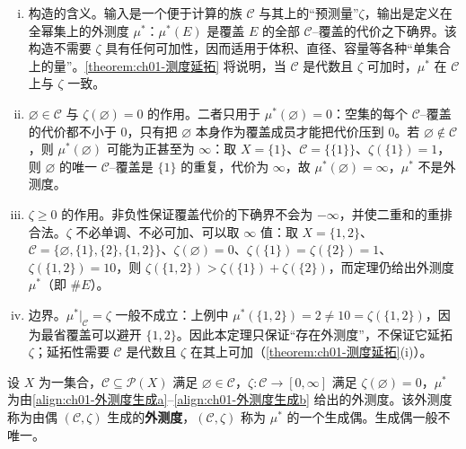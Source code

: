 \documentclass[../../main.tex]{subfiles}%
\begin{document}
\begin{remark}\label{remark:ch01-外测度生成}
\begin{enumerate}[(i)]
\item 构造的含义。输入是一个便于计算的族 $\mathcal{C}$ 与其上的“预测量”$\zeta$，输出是定义在全幂集上的外测度 $\mu^*$：$\mu^*(E)$ 是覆盖 $E$ 的全部 $\mathcal{C}$--覆盖的代价之下确界。该构造不需要 $\zeta$ 具有任何可加性，因而适用于体积、直径、容量等各种“单集合上的量”。\cref{theorem:ch01-测度延拓} 将说明，当 $\mathcal{C}$ 是代数且 $\zeta$ 可加时，$\mu^*$ 在 $\mathcal{C}$ 上与 $\zeta$ 一致。
\item $\varnothing\in\mathcal{C}$ 与 $\zeta(\varnothing )=0$ 的作用。二者只用于 $\mu^*(\varnothing )=0$：空集的每个 $\mathcal{C}$--覆盖的代价都不小于 $0$，只有把 $\varnothing$ 本身作为覆盖成员才能把代价压到 $0$。若 $\varnothing\notin\mathcal{C}$，则 $\mu^*(\varnothing )$ 可能为正甚至为 $\infty$：取 $X=\{1\}$、$\mathcal{C}=\{\{1\}\}$、$\zeta(\{1\})=1$，则 $\varnothing$ 的唯一 $\mathcal{C}$--覆盖是 $\{1\}$ 的重复，代价为 $\infty$，故 $\mu^*(\varnothing )=\infty$，$\mu^*$ 不是外测度。
\item $\zeta\geqslant 0$ 的作用。非负性保证覆盖代价的下确界不会为 $-\infty$，并使二重和的重排合法。$\zeta$ 不必单调、不必可加、可以取 $\infty$ 值：取 $X=\{1,2\}$、$\mathcal{C}=\{\varnothing ,\{1\},\{2\},\{1,2\}\}$、$\zeta(\varnothing )=0$、$\zeta(\{1\})=\zeta(\{2\})=1$、$\zeta(\{1,2\})=10$，则 $\zeta(\{1,2\})>\zeta(\{1\})+\zeta(\{2\})$，而定理仍给出外测度 $\mu^*$（即 $\#E$）。
\item 边界。$\mu^*|_{\mathcal{C}}=\zeta$ 一般不成立：上例中 $\mu^*(\{1,2\})=2\neq 10=\zeta(\{1,2\})$，因为最省覆盖可以避开 $\{1,2\}$。因此本定理只保证“存在外测度”，不保证它延拓 $\zeta$；延拓性需要 $\mathcal{C}$ 是代数且 $\zeta$ 在其上可加（\cref{theorem:ch01-测度延拓}(i)）。
\end{enumerate}
\end{remark}

\begin{definition}\label{definition:ch01-外测度生成定义}
设 $X$ 为一集合，$\mathcal{C}\subseteq\mathcal{P}(X)$ 满足 $\varnothing\in\mathcal{C}$，$\zeta:\mathcal{C}\to[0,\infty]$ 满足 $\zeta(\varnothing )=0$，$\mu^*$ 为由\eqref{align:ch01-外测度生成a}--\eqref{align:ch01-外测度生成b} 给出的外测度。该外测度称为由偶 $(\mathcal{C},\zeta)$ 生成的\textbf{外测度}，$(\mathcal{C},\zeta)$ 称为 $\mu^*$ 的一个生成偶。生成偶一般不唯一。
\end{definition}
\end{document}
